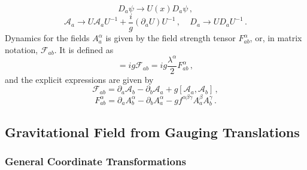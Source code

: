 \documentclass[11pt,a4paper]{article}
\begin{document}
\begin{equation}
D_a\psi\rightarrow U(x)D_a\psi  \,,
\end{equation}
\begin{equation}\label{GaugeFieldTransfNonabelianCase}
\mathcal{A}_a\rightarrow U\mathcal{A}_a U^{-1}+\dfrac{i}{g}(\partial_a U)U^{-1} \,, ~~~~~ D_a\rightarrow UD_a U^{-1} \,.
\end{equation}
Dynamics for the fields $A^\alpha_a$ is given by the field strength tensor $F^\alpha_{ab}$, or, in matrix notation, $\mathcal{F}_{ab}$. It is defined as
\begin{equation}
[D_a,D_b]=ig\mathcal{F}_{ab}=ig\dfrac{\lambda^\alpha}{2}F^\alpha_{ab} \,,
\end{equation}
and the explicit expressions are given by
\begin{equation}
\mathcal{F}_{ab}=\partial_a\mathcal{A}_b-\partial_b\mathcal{A}_a+g[\mathcal{A}_a,\mathcal{A}_b] \,,
\end{equation}
\begin{equation}
F^\alpha_{ab}=\partial_a A^\alpha_b-\partial_b A^\alpha_a -g f^{\alpha\beta\gamma}A^\beta_a A^\gamma_b \,.
\end{equation}

\subsection{Gravitational Field from Gauging Translations}
\label{sec:gravfield}

\subsubsection{General Coordinate Transformations}
\end{document}
